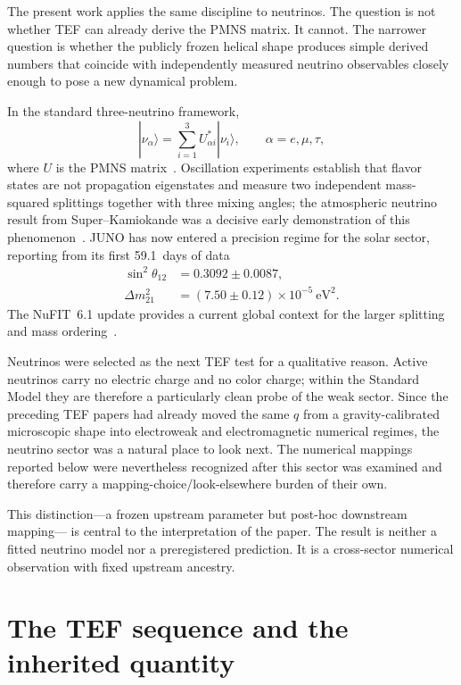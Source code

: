 \documentclass[10pt,twocolumn]{article}
\begin{document}
The present work applies the same discipline to neutrinos.  The question is not
whether TEF can already derive the PMNS matrix.  It cannot.  The narrower
question is whether the publicly frozen helical shape produces simple derived
numbers that coincide with independently measured neutrino observables closely
enough to pose a new dynamical problem.

In the standard three-neutrino framework,
\begin{equation}
|\nu_\alpha\rangle
=
\sum_{i=1}^{3}U_{\alpha i}^{*}|\nu_i\rangle,
\qquad \alpha=e,\mu,\tau,
\label{eq:flavor}
\end{equation}
where $U$ is the PMNS matrix~\cite{MNS1962}.  Oscillation experiments establish
that flavor states are not propagation eigenstates and measure two independent
mass-squared splittings together with three mixing angles; the atmospheric
neutrino result from Super--Kamiokande was a decisive early demonstration of
this phenomenon~\cite{SuperK1998}.  JUNO has now
entered a precision regime for the solar sector, reporting from its first
59.1~days of data~\cite{JUNO2026}
\begin{align}
\sin^2\theta_{12}
&=0.3092\pm0.0087,
\label{eq:juno-theta}\\
\Delta m^2_{21}
&=(7.50\pm0.12)\times10^{-5}\ \mathrm{eV}^2.
\label{eq:juno-dm21}
\end{align}
The NuFIT~6.1 update provides a current global context for the larger splitting
and mass ordering~\cite{Esteban2026}.

Neutrinos were selected as the next TEF test for a qualitative reason.  Active
neutrinos carry no electric charge and no color charge; within the Standard
Model they are therefore a particularly clean probe of the weak sector.  Since
the preceding TEF papers had already moved the same $q$ from a gravity-calibrated
microscopic shape into electroweak and electromagnetic numerical regimes, the
neutrino sector was a natural place to look next.  The numerical mappings
reported below were nevertheless recognized after this sector was examined and
therefore carry a mapping-choice/look-elsewhere burden of their own.

This distinction---a frozen upstream parameter but post-hoc downstream mapping---
is central to the interpretation of the paper.  The result is neither a fitted
neutrino model nor a preregistered prediction.  It is a cross-sector numerical
observation with fixed upstream ancestry.

\section{The TEF sequence and the inherited quantity}
\label{sec:sequence}
\end{document}

